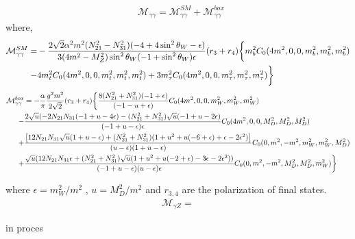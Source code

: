 \begin{align}
\label{eq:M-FFGG}
&\mathcal{M}_{\gamma\gamma}=\mathcal{M}_{\gamma\gamma}^{SM}+\mathcal{M}_{\gamma\gamma}^{box}\,
\end{align}
where,
\begin{align}
\label{eq:M-FFGG1}
\mathcal{M}_{\gamma\gamma}^{SM}
=&-\dfrac{2 \sqrt{2} \alpha^2 m^2 (N_{21}^2 - N_{31}^2)
(-4 + 4 \sin^2\theta_W - \epsilon) }{3(4 m^2 - M_Z^2) \sin^2\theta_W  (-1 + \sin^2\theta_W ) \epsilon}
(r_3+r_4)\bigg{\{}
m_b^2C_0(4 m^2,0,0, m_b^2, m_b^2, m_b^2)\nonumber\\
-&4m_t^2C_0(4 m^2,0,0, m_t^2, m_t^2, m_t^2)+3m_{\tau}^2C_0(4 m^2,0,0, m_{\tau}^2, m_{\tau}^2, m_{\tau}^2)
\bigg{\}}
\end{align}
%
\begin{align}
\label{eq:M-FFGG2}
\mathcal{M}_{\gamma\gamma}^{box}&
=-\dfrac{\alpha}{\pi}\dfrac{ g^2 m^2}{2 \sqrt{2}}(r_3+r_4)
\bigg{\{}
\dfrac{8 (N_{21}^2 + N_{31}^2)(-1 +\epsilon)}{(-1 - u + \epsilon)}C_0(4 m^2,0,0, m_W^2, m_W^2, m_W^2)\nonumber\\
-&\dfrac{2\sqrt{u}(-2 N_{21} N_{31}(-1 + u - 4 \epsilon) 
-(N_{21}^2+N_{31}^2)\sqrt{u}(-1 + u - 2 \epsilon) }{(-1 + u - \epsilon) \epsilon}C_0(4 m^2,0,0, M_D^2, M_D^2, M_D^2)\nonumber\\
+& \dfrac{\left[12 N_{21}N_{31}\sqrt{u}(1+u-\epsilon)+(N_{21}^2+N_{31}^2)(1+u^2 +u(-6 +\epsilon)+\epsilon -
2 \epsilon^2)\right]}{(u-\epsilon)(1+u-\epsilon)}C_0(0,m^2,-m^2,m_W^2, m_W^2, M_D^2)\nonumber\\
+&\dfrac{\sqrt{u} (12 N_{21} N_{31} \epsilon + (N_{21}^2 +N_{31}^2)\sqrt{u} (1 + u^2 + u (-2 + \epsilon) - 3 \epsilon - 2 \epsilon^2) )}{(-1 + u - \epsilon) (u - \epsilon)\epsilon}C_0(0,m^2,-m^2,M_D^2, M_D^2, m_W^2)
\bigg{\}}\,
\end{align}
%

%
where $\epsilon=m_W^2/m^2 $ , $ u=M_D^2/m^2$ and $r_{3,4}$ are the polarization of final states.
%
\begin{align}
\label{eq:M-FFGZ}
\mathcal{M}_{\gamma Z}=
\end{align}

{\color{red} in proces}













